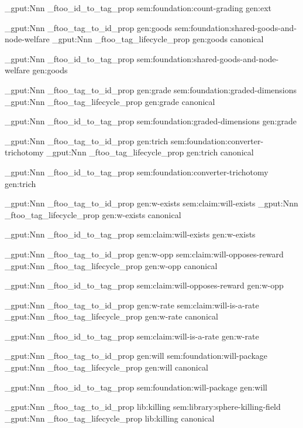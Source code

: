 \prop_gput:Nnn \g_ftoo_id_to_tag_prop { sem:foundation:count-grading } { gen:ext }


\prop_gput:Nnn \g_ftoo_tag_to_id_prop { gen:goods } { sem:foundation:shared-goods-and-node-welfare }
\prop_gput:Nnn \g_ftoo_tag_lifecycle_prop { gen:goods } { canonical }

\prop_gput:Nnn \g_ftoo_id_to_tag_prop { sem:foundation:shared-goods-and-node-welfare } { gen:goods }


\prop_gput:Nnn \g_ftoo_tag_to_id_prop { gen:grade } { sem:foundation:graded-dimensions }
\prop_gput:Nnn \g_ftoo_tag_lifecycle_prop { gen:grade } { canonical }

\prop_gput:Nnn \g_ftoo_id_to_tag_prop { sem:foundation:graded-dimensions } { gen:grade }


\prop_gput:Nnn \g_ftoo_tag_to_id_prop { gen:trich } { sem:foundation:converter-trichotomy }
\prop_gput:Nnn \g_ftoo_tag_lifecycle_prop { gen:trich } { canonical }

\prop_gput:Nnn \g_ftoo_id_to_tag_prop { sem:foundation:converter-trichotomy } { gen:trich }


\prop_gput:Nnn \g_ftoo_tag_to_id_prop { gen:w-exists } { sem:claim:will-exists }
\prop_gput:Nnn \g_ftoo_tag_lifecycle_prop { gen:w-exists } { canonical }

\prop_gput:Nnn \g_ftoo_id_to_tag_prop { sem:claim:will-exists } { gen:w-exists }


\prop_gput:Nnn \g_ftoo_tag_to_id_prop { gen:w-opp } { sem:claim:will-opposes-reward }
\prop_gput:Nnn \g_ftoo_tag_lifecycle_prop { gen:w-opp } { canonical }

\prop_gput:Nnn \g_ftoo_id_to_tag_prop { sem:claim:will-opposes-reward } { gen:w-opp }


\prop_gput:Nnn \g_ftoo_tag_to_id_prop { gen:w-rate } { sem:claim:will-is-a-rate }
\prop_gput:Nnn \g_ftoo_tag_lifecycle_prop { gen:w-rate } { canonical }

\prop_gput:Nnn \g_ftoo_id_to_tag_prop { sem:claim:will-is-a-rate } { gen:w-rate }


\prop_gput:Nnn \g_ftoo_tag_to_id_prop { gen:will } { sem:foundation:will-package }
\prop_gput:Nnn \g_ftoo_tag_lifecycle_prop { gen:will } { canonical }

\prop_gput:Nnn \g_ftoo_id_to_tag_prop { sem:foundation:will-package } { gen:will }


\prop_gput:Nnn \g_ftoo_tag_to_id_prop { lib:killing } { sem:library:sphere-killing-field }
\prop_gput:Nnn \g_ftoo_tag_lifecycle_prop { lib:killing } { canonical }


